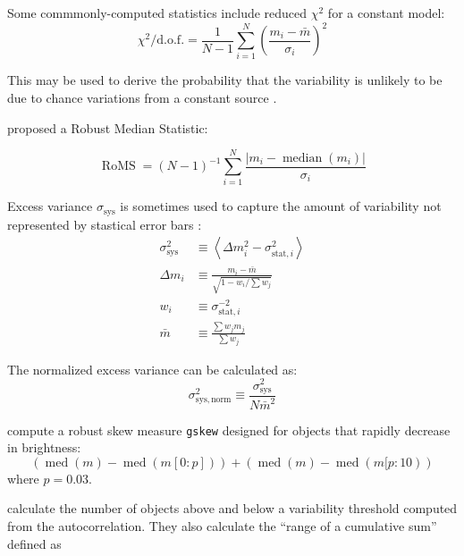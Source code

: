 \documentclass[DM,authoryear,toc]{lsstdoc}
\begin{document}
Some commmonly-computed statistics include reduced $\chi^2$ for a constant model: 
\begin{equation}
\chi^{2} / \mathrm{d} . \mathrm{o.f.}=\frac{1}{N-1} \sum_{i=1}^{N}\left(\frac{m_{i}-\bar{m}}{\sigma_{i}}\right)^{2}
\end{equation}

This may be used to derive the probability that the variability is unlikely to be due to chance variations from a constant source \citep[e.g.,][]{McLaughlin:96:EGRETVariability}.

\citet{Enoch:03:Variability} proposed a Robust Median Statistic:

\begin{equation}
\operatorname{RoMS}=(N-1)^{-1} \sum_{i=1}^{N} \frac{\left|m_{i}-\operatorname{median}\left(m_{i}\right)\right|}{\sigma_{i}}
\end{equation}

Excess variance $\sigma_{\mathrm{sys}}$ is sometimes used to capture the amount of variability not represented by stastical error bars \citep[e.g., in][]{2018PASP..130e4501B}:
\begin{equation}
\begin{aligned} \sigma_{\mathrm{sys}}^{2} & \equiv\left\langle\Delta m_{i}^{2}-\sigma_{\mathrm{stat}, i}^{2}\right\rangle \\ \Delta m_{i} & \equiv \frac{m_{i}-\bar{m}}{\sqrt{1-w_{i} / \sum w_{j}}} \\ w_{i} & \equiv \sigma_{\mathrm{stat}, i}^{-2} \\ \bar{m} & \equiv \frac{\sum w_{j} m_{j}}{\sum w_{j}} \end{aligned}
\end{equation}

The normalized excess variance can be calculated \citep[e.g.,][]{Nandra:97:AGNVarability,Allevato:13:AGNVariability} as: 
\begin{equation}
	\sigma_{\mathrm{sys,norm}}^2  \equiv \frac{\sigma_{\mathrm{sys}}^2} {N \bar{m}^2}
\end{equation}

\citet{Richards:12:ASASCatalog} compute a robust skew measure \texttt{gskew} designed for objects that rapidly decrease in brightness: 
$$
(\operatorname{med}(m)-\operatorname{med}(m[0 : p]))+(\operatorname{med}(m)-\operatorname{med}(m[p : 10))
$$ 
where $p = 0.03$.

\citet{Kim:11:QSOVariability} calculate the number of objects above and below a variability threshold computed from the autocorrelation.
They also calculate the ``range of a cumulative sum'' defined as
\end{document}
